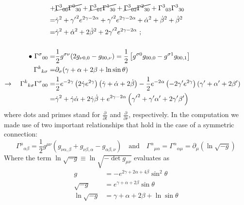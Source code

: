 \begin{align*}
    \\ +&\cancel{\Gamma^3 {}_{0 0} \Gamma^0 {}_{3 0}} + \cancel{\Gamma^3 {}_{0 1} \Gamma^1 {}_{3 0}} + \cancel{\Gamma^3 {}_{0 2} \Gamma^2 {}_{3 0}}  + \Gamma^3 {}_{0 3} \Gamma^3 {}_{3 0} 
    \\ =& \Dot{\gamma}^2 + {\gamma^\prime}^2 e^{2\gamma-2\alpha} + {\gamma^\prime}^2 e^{2\gamma-2\alpha}+ \Dot{\alpha}^2 + \Dot{\beta}^2 + \Dot{\beta}^2
    \\ =& \dot{\gamma}^2 + \dot{\alpha}^2 + 2 \dot{\beta}^2 + 2{\gamma^\prime}^2 e^{2\gamma-2\alpha} \text{ ;}
    \\[15pt]  \bullet \text{ } \Gamma^\sigma 
    {}_{0 0} =&  \frac{1}{2} g^{\sigma \nu}(2g_{\nu 0,0} - g_{00,\nu})  
    = \frac{1}{2} \left[ g^{\sigma 0}g_{00,0} -g^{\sigma 1}g_{00,1}\right]
    \\ \Gamma^k {}_{k \sigma} =& \partial_\sigma (\gamma + \alpha +2\beta + \ln{\sin{\theta}})
    \\ \rightarrow \quad  \Gamma^k {}_{k \sigma} \Gamma^\sigma {}_{0 0} =& \frac{1}{2} e^{-2\gamma}\left(2 \Dot{\gamma}e^{2\gamma}\right)  \left(\Dot{\gamma} + \Dot{\alpha} +2\Dot{\beta} \right) - \frac{1}{2} e^{-2\alpha}\left(- 2 \gamma^\prime e^{2\gamma}\right)  \left(\gamma^\prime +\alpha^\prime +2\beta^\prime \right)
    \\ =&\dot{\gamma}^2 + \dot{\gamma}\Dot{\alpha} + 2\dot{\gamma}\Dot{\beta} + e^{2\gamma-2\alpha}\left({\gamma^\prime}^2+ \gamma^\prime \alpha^\prime + 2\gamma^\prime \beta^\prime \right)
\end{align*}
where dots and primes stand for $\frac{\partial}{\partial t}$ and  $\frac{\partial}{\partial r}$, respectively. 
In the computation we made use of two important relationships that hold in the case of a symmetric connection: 
\begin{equation*}
    \Gamma^\mu {}_{\alpha \beta} = \frac{1}{2} g^{\mu \nu} \left( g_{\nu \alpha,\beta} + g_{\nu \beta,\alpha} -  g_{\alpha \beta,\nu} \right) \quad \text{and} \quad \Gamma^\alpha {}_{\mu \alpha} = \Gamma^\alpha {}_{\alpha \mu} = \partial_\mu \left( \ln{\sqrt{-g}}\right)
\end{equation*}
Where the term $\ln{\sqrt{-g}} \equiv \ln{\sqrt{-\det g_{\mu \nu}}}$ evaluates as
\begin{align*}
    g  &= -e^{2\gamma + 2\alpha +4\beta}\sin^2{\theta}
    \\ \sqrt{-g} &= e^{\gamma + \alpha +2\beta}\sin{\theta}
    \\ \ln{\sqrt{-g}} &=\gamma + \alpha +2\beta + \ln{\sin{\theta}}
\end{align*}

